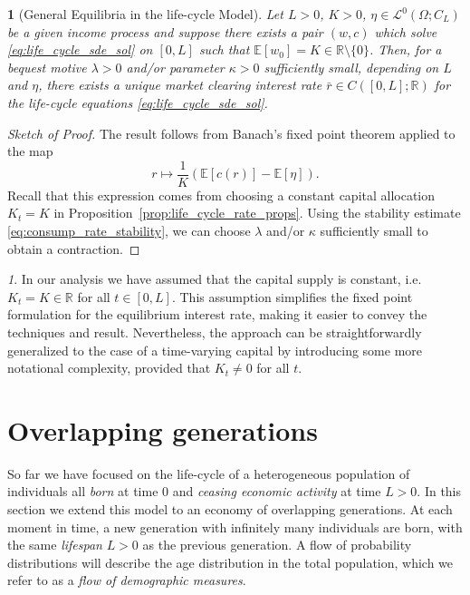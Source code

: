 \documentclass[11pt,oneside,english,reqno,dvipsnames,table]{amsart}
\numberwithin{equation}{section}
\theoremstyle{plain}
\theoremstyle{definition}
\theoremstyle{remark}
\newtheorem{rem}[thm]{\protect\remarkname}
\theoremstyle{plain}
\theoremstyle{plain}
\theoremstyle{plain}
\newtheorem{cor}[thm]{\protect\corollaryname}
\theoremstyle{plain}
\theoremstyle{plain}
\theoremstyle{plain}
\theoremstyle{plain}
\providecommand{\corollaryname}{Corollary}
\providecommand{\remarkname}{Remark}
\providecommand{\remarkname}{Remark}
\newcommand{\red}[1]{#1}
\newcommand{\RR}{\mathbb{R}}
\newcommand{\mbE}{\mathbb{E}}
\newcommand{\mbR}{\mathbb{R}}
\newcommand{\msL}{\mathscr{L}}
\numberwithin{thm}{section}
\begin{document}
  
\begin{cor}[General Equilibria in the life-cycle Model]\label{cor:life_cycle_equilibrium}
    Let $L>0$, $K>0$, $\eta \in \msL^0(\Omega;C_L)$ be a given income process and suppose there exists a pair $(w,c)$ which solve  \eqref{eq:life_cycle_sde_sol} on $[0,L]$ such that $\mbE[w_0]=K \in \mbR\setminus\{0\}$. Then, for a bequest motive $\lambda>0$ and/or parameter $\kappa>0$ sufficiently small, depending on $L$ and $\eta$, there exists a unique market clearing interest rate $\bar{r} \in C([0,L];\mbR)$ for the life-cycle equations \ref{eq:life_cycle_sde_sol}. 
\end{cor}
  \begin{proof}[Sketch of Proof]
     The result follows from Banach's fixed point theorem applied to the map
     \begin{equation*}
         r \mapsto \frac{1}{K} \left(\mbE[c(r)] -\mbE[\eta]\right).
     \end{equation*}
   Recall that this expression comes from choosing a constant capital allocation $K_t=K$ in Proposition~\ref{prop:life_cycle_rate_props}. Using the stability estimate \eqref{eq:consump_rate_stability}, we can choose $\lambda$ and/or $\kappa$ sufficiently small to obtain a contraction.
  \end{proof}
%
\begin{rem}
    In our analysis we have assumed that the capital supply is constant, i.e. $K_t=K\in \RR$ for all $t\in [0,L]$. This assumption simplifies the fixed point formulation for the equilibrium interest rate, making it easier to convey the techniques and result. Nevertheless, the approach can be straightforwardly generalized to the case of a time-varying capital by introducing some more notational complexity, provided that $K_t\neq 0$ for all $t$. 
\end{rem}
%
\section{Overlapping generations}\label{sec:OLG}
%
%
So far we have focused on the life-cycle of a heterogeneous population of individuals all \emph{born} at time $0$ and \emph{ceasing economic activity} at time $L>0$.  In this section we extend this model to an economy of overlapping generations. At each moment in time, a new generation with infinitely many individuals are born, with the same \emph{lifespan} $L>0$ as the previous generation. A  flow of probability distributions will describe the age distribution in the total population, which we refer to  as a \emph{flow of demographic measures}. %
\end{document}
